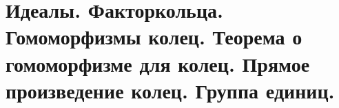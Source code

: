 \section{
    Идеалы. Факторкольца. Гомоморфизмы колец. Теорема о гомоморфизме для колец. Прямое произведение колец. Группа единиц.
}








